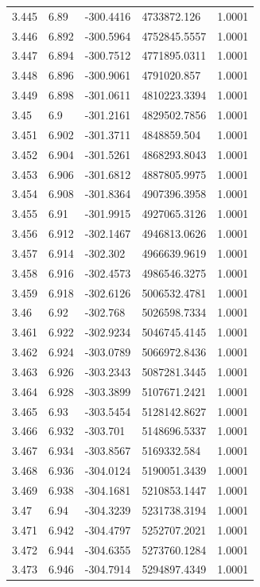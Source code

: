 \begin{tabular}{lllll}
3.445 & 6.89 & -300.4416 & 4733872.126 & 1.0001 \\
3.446 & 6.892 & -300.5964 & 4752845.5557 & 1.0001 \\
3.447 & 6.894 & -300.7512 & 4771895.0311 & 1.0001 \\
3.448 & 6.896 & -300.9061 & 4791020.857 & 1.0001 \\
3.449 & 6.898 & -301.0611 & 4810223.3394 & 1.0001 \\
3.45 & 6.9 & -301.2161 & 4829502.7856 & 1.0001 \\
3.451 & 6.902 & -301.3711 & 4848859.504 & 1.0001 \\
3.452 & 6.904 & -301.5261 & 4868293.8043 & 1.0001 \\
3.453 & 6.906 & -301.6812 & 4887805.9975 & 1.0001 \\
3.454 & 6.908 & -301.8364 & 4907396.3958 & 1.0001 \\
3.455 & 6.91 & -301.9915 & 4927065.3126 & 1.0001 \\
3.456 & 6.912 & -302.1467 & 4946813.0626 & 1.0001 \\
3.457 & 6.914 & -302.302 & 4966639.9619 & 1.0001 \\
3.458 & 6.916 & -302.4573 & 4986546.3275 & 1.0001 \\
3.459 & 6.918 & -302.6126 & 5006532.4781 & 1.0001 \\
3.46 & 6.92 & -302.768 & 5026598.7334 & 1.0001 \\
3.461 & 6.922 & -302.9234 & 5046745.4145 & 1.0001 \\
3.462 & 6.924 & -303.0789 & 5066972.8436 & 1.0001 \\
3.463 & 6.926 & -303.2343 & 5087281.3445 & 1.0001 \\
3.464 & 6.928 & -303.3899 & 5107671.2421 & 1.0001 \\
3.465 & 6.93 & -303.5454 & 5128142.8627 & 1.0001 \\
3.466 & 6.932 & -303.701 & 5148696.5337 & 1.0001 \\
3.467 & 6.934 & -303.8567 & 5169332.584 & 1.0001 \\
3.468 & 6.936 & -304.0124 & 5190051.3439 & 1.0001 \\
3.469 & 6.938 & -304.1681 & 5210853.1447 & 1.0001 \\
3.47 & 6.94 & -304.3239 & 5231738.3194 & 1.0001 \\
3.471 & 6.942 & -304.4797 & 5252707.2021 & 1.0001 \\
3.472 & 6.944 & -304.6355 & 5273760.1284 & 1.0001 \\
3.473 & 6.946 & -304.7914 & 5294897.4349 & 1.0001 \\

\end{tabular}
